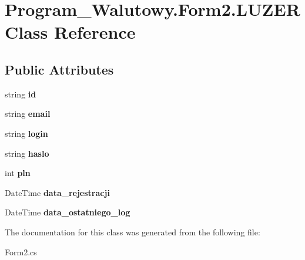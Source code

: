 \hypertarget{class_program___walutowy_1_1_form2_1_1_l_u_z_e_r}{}\section{Program\+\_\+\+Walutowy.\+Form2.\+L\+U\+Z\+ER Class Reference}
\label{class_program___walutowy_1_1_form2_1_1_l_u_z_e_r}
\subsection*{Public Attributes}
\begin{DoxyCompactItemize}
\item 
\mbox{\label{class_program___walutowy_1_1_form2_1_1_l_u_z_e_r_ae37ff26fb7d6f67ce3cd6796958f5e77}} 
string {\bfseries id}
\item 
\mbox{\label{class_program___walutowy_1_1_form2_1_1_l_u_z_e_r_a92925d7ae6547c4b34581f248c66df7f}} 
string {\bfseries email}
\item 
\mbox{\label{class_program___walutowy_1_1_form2_1_1_l_u_z_e_r_a2ef60728c95aa1d9155b0222824e2b87}} 
string {\bfseries login}
\item 
\mbox{\label{class_program___walutowy_1_1_form2_1_1_l_u_z_e_r_afc8e4633ede553e32eb5458c9d80a050}} 
string {\bfseries haslo}
\item 
\mbox{\label{class_program___walutowy_1_1_form2_1_1_l_u_z_e_r_a64bd38fa175a28ffa78609271aeb2b7f}} 
int {\bfseries pln}
\item 
\mbox{\label{class_program___walutowy_1_1_form2_1_1_l_u_z_e_r_aa1d78553e4c4cd1bd86f38c792dd567d}} 
Date\+Time {\bfseries data\+\_\+rejestracji}
\item 
\mbox{\label{class_program___walutowy_1_1_form2_1_1_l_u_z_e_r_a76e70401fff2ff701446e27e17d24839}} 
Date\+Time {\bfseries data\+\_\+ostatniego\+\_\+log}
\end{DoxyCompactItemize}


The documentation for this class was generated from the following file\+:\begin{DoxyCompactItemize}
\item 
Form2.\+cs\end{DoxyCompactItemize}
